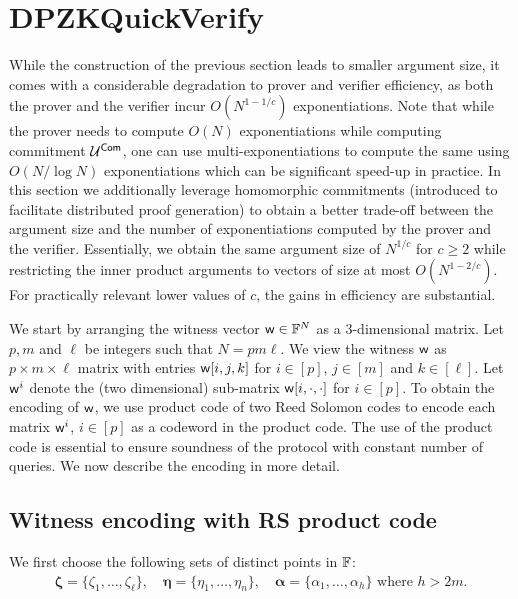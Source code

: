 \newcommand{\fft}{\mathsf{FFT}}
\newcommand{\ifft}{\mathsf{IFFT}}
\newcommand{\open}{\mathsf{Open}}

\section{DPZKQuickVerify} \label{sec:quickverify}
While the construction of the previous section leads to smaller argument size,
it comes with a considerable degradation to prover and verifier efficiency, as
both the prover and the verifier incur $O(N^{1-1/c})$ exponentiations. Note
that while the prover needs to compute $O(N)$ exponentiations while computing
commitment $\mathcal{U}^{\mathsf{Com}}$, one can use multi-exponentiations to compute the same
using $O(N/\log{N})$ exponentiations which can be significant speed-up in
practice. In this section we additionally leverage homomorphic commitments
(introduced to facilitate distributed proof generation) to obtain a better
trade-off between the argument size and the number of exponentiations computed
by the prover and the verifier. Essentially, we obtain the same argument size
of $N^{1/c}$ for $c\geq 2$ while restricting the inner product arguments to
vectors of size at most $O(N^{1-2/c})$. For practically relevant lower values
of $c$, the gains in efficiency are substantial.
   
We start by arranging the witness vector $\mathsf{w}\in \mathbb{F}^N$ as a $3$-dimensional
 matrix. Let $p,m$ and $\ell$ be integers such that $N=pm\ell$. We view the
witness $\mathsf{w}$ 
as $p\times m\times\ell$ matrix with entries $\mathsf{w}[i,j,k]$ for $i\in [p]$,
$j\in [m]$ and $k\in [\ell]$. Let $\mathsf{w}^i$ denote the (two dimensional) sub-matrix
$\mathsf{w}[i,\cdot,\cdot]$ for $i\in [p]$. To obtain the encoding of
$\mathsf{w}$, we use product code of two Reed Solomon codes to encode each matrix
$\mathsf{w}^i$,
$i\in [p]$ as a codeword in the product code. The use of the product code is
essential to ensure soundness of the protocol with constant number of queries.
We now describe the encoding in more detail.

\subsection{Witness encoding with RS product code}\label{sec:witencoding}
We first choose the following sets of distinct points in $\mathbb{F}$:
\begin{align}\label{eq:points}
\bm{\zeta} =\{\zeta_1,\ldots,\zeta_{\ell}\},\quad 
\bm{\eta}  = \{\eta_1,\ldots,\eta_n \},\quad
\bm{\alpha} = \{\alpha_1,\ldots,\alpha_{h}\} \text{ where } h>2m. 
\end{align}

